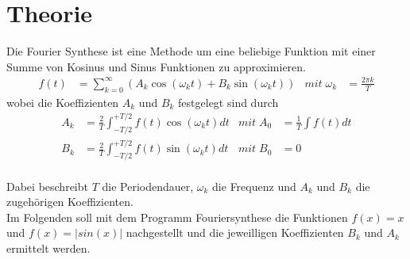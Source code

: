 \section{Theorie}
\label{sec:Theorie}
Die Fourier Synthese ist eine Methode um eine beliebige Funktion mit einer Summe von Kosinus und Sinus Funktionen zu approximieren.
\begin{align}
    f(t) &= \sum_{k=0}^{\infty} (A_k\cos(\omega_k t)+B_k\sin(\omega_k t)) &   mit \; \omega_k &= \frac{2\pi k}{T}
\end{align}
wobei die Koeffizienten $A_k$ und $B_k$ festgelegt sind durch
\begin{align}
    A_k &= \frac{2}{T} \int_{-T/2}^{+T/2} f(t)\cos(\omega_k t) dt    &  mit \; A_0 &= \frac{1}{T} \int f(t) dt \\
    B_k &= \frac{2}{T} \int_{-T/2}^{+T/2} f(t)\sin(\omega_k t) dt    &  mit \; B_0 &= 0
\end{align}
\\
Dabei beschreibt $T$ die Periodendauer, $\omega_k$ die Frequenz und $A_k$ und $B_k$ die zugehörigen Koeffizienten. \\

Im Folgenden soll mit dem Programm Fouriersynthese %
die Funktionen $f(x)=x$ und $f(x)=|sin(x)|$ nachgestellt und die jeweilligen Koeffizienten $B_k$ und $A_k$ ermittelt werden.
